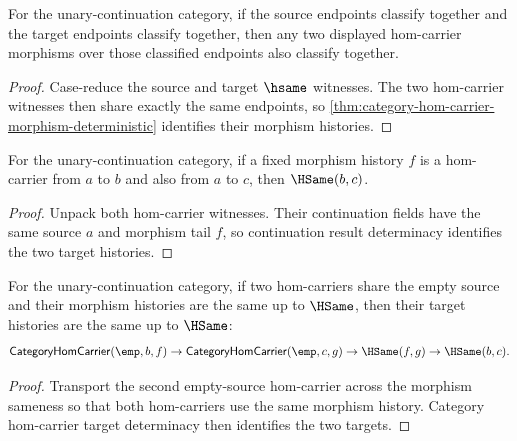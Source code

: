 \begin{theorem}
\label{thm:category-hom-carrier-endpoint-hsame-morphism-deterministic}
For the unary-continuation category, if the source endpoints classify together
and the target endpoints classify together, then any two displayed hom-carrier
morphisms over those classified endpoints also classify together.
\end{theorem}
\begin{proof}
Case-reduce the source and target $\hsame$ witnesses. The two hom-carrier
witnesses then share exactly the same endpoints, so
\autoref{thm:category-hom-carrier-morphism-deterministic} identifies their
morphism histories.
\end{proof}

\begin{theorem}
\label{thm:category-hom-carrier-target-deterministic}
For the unary-continuation category, if a fixed morphism history $f$ is a
hom-carrier from $a$ to $b$ and also from $a$ to $c$, then
$\HSame(b,c)$.
\end{theorem}
\begin{proof}
Unpack both hom-carrier witnesses. Their continuation fields have the same
source $a$ and morphism tail $f$, so continuation result determinacy
identifies the two target histories.
\end{proof}

\begin{theorem}
\label{thm:category-hom-carrier-empty-source-morphism-target-deterministic}
For the unary-continuation category, if two hom-carriers share the empty source
and their morphism histories are the same up to $\HSame$, then their target
histories are the same up to $\HSame$:
$$
\mathsf{CategoryHomCarrier}(\emp,b,f)\to
\mathsf{CategoryHomCarrier}(\emp,c,g)\to
\HSame(f,g)\to
\HSame(b,c).
$$
\end{theorem}
\begin{proof}
Transport the second empty-source hom-carrier across the morphism sameness so
that both hom-carriers use the same morphism history. Category hom-carrier
target determinacy then identifies the two targets.
\end{proof}

